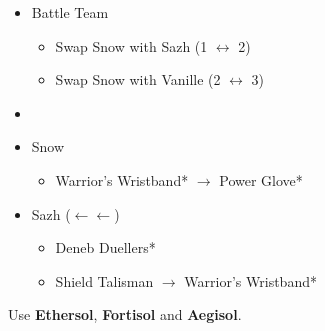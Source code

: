 \begin{menu}
	\begin{itemize}
		\paradigm
		\begin{itemize}
			\item Battle Team
				\begin{itemize}
					\item Swap Snow with Sazh (1 $\leftrightarrow$ 2)
					\item Swap Snow with Vanille (2 $\leftrightarrow$ 3)
				\end{itemize}
			\item {}%
				{\paradigmline{(\rav)}{(\com)}{\com}}%
				{\paradigmline[4]{\com}{\com}{\com}}%
				{\paradigmline{(\rav)}{(\rav)}{\sen}}%
				{\paradigmline{(\com)}{\med}{(\sen)}}%
				{\paradigmline{\rav}{(\rav)}{(\com)}}%
				{\paradigmline{\rav}{\rav}{\rav}}%
		\end{itemize}
		\equip
		\begin{itemize}
			\item Snow
				\begin{itemize}
					\item Warrior's Wristband* $\rightarrow$ Power Glove*
				\end{itemize}
			\item Sazh ($\leftarrow\leftarrow$)
				\begin{itemize}
					\item Deneb Duellers*
					\item Shield Talisman $\rightarrow$ Warrior's Wristband*
				\end{itemize}
		\end{itemize}
	\end{itemize}
\end{menu}

Use \textbf{Ethersol}, \textbf{Fortisol} and \textbf{Aegisol}.

\renewcommand{\first}{[1] Aggression (\rav/\com/\com)}
\renewcommand{\second}{[2] Cerberus (\com/\com/\com)}
\renewcommand{\third}{[3] Mystic Tower (\rav/\rav/\sen)}
\renewcommand{\fourth}{[4] Solidarity (\com/\med/\sen)}
\renewcommand{\fifth}{[5] Relentless Assault (\rav/\rav/\com)}
\renewcommand{\sixth}{[6] Tri-Disaster (\rav/\rav/\rav)}


